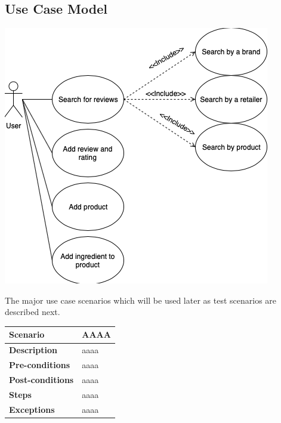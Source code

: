 \documentclass{article}
\begin{document}
\subsection{Use Case Model}
\includegraphics[scale=0.8]{usecasemodel.png}\linebreak\linebreak

The major use case scenarios which will be used later as test scenarios are described next.

\begin{table}[!h]
\begin{tabular}{|p{3cm}|p{8cm}|}
\hline
\textbf{Scenario} & \textbf{AAAA} \\
\hline
\textbf{Description}          & aaaa \\
\hline
\textbf{Pre-conditions}       & aaaa \\
\hline
\textbf{Post-conditions}      & aaaa \\
\hline
\textbf{Steps}                & aaaa \\
\hline
\textbf{Exceptions}           & aaaa \\
\hline
\end{tabular}
\end{table}
\end{document}
